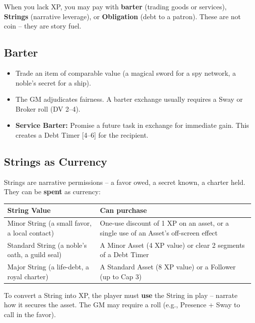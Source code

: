 When you lack XP, you may pay with \textbf{barter} (trading goods or services), \textbf{Strings} (narrative leverage), or \textbf{Obligation} (debt to a patron). These are not coin -- they are story fuel.

\subsection{Barter}
\label{subsec:barter}

\begin{itemize}
  \item Trade an item of comparable value (a magical sword for a spy network, a noble's secret for a ship).
  \item The GM adjudicates fairness. A barter exchange usually requires a Sway or Broker roll (DV 2--4).
  \item \textbf{Service Barter:} Promise a future task in exchange for immediate gain. This creates a Debt Timer [4--6] for the recipient.
\end{itemize}

\subsection{Strings as Currency}
\label{subsec:strings-currency}

Strings are narrative permissions -- a favor owed, a secret known, a charter held. They can be \textbf{spent} as currency:

\begin{center}
\begin{tabular}{ll}
\toprule
\textbf{String Value} & \textbf{Can purchase} \\
\midrule
Minor String (a small favor, a local contact) & One-use discount of 1 XP on an asset, or a single use of an Asset's off-screen effect \\
Standard String (a noble's oath, a guild seal) & A Minor Asset (4 XP value) or clear 2 segments of a Debt Timer \\
Major String (a life-debt, a royal charter) & A Standard Asset (8 XP value) or a Follower (up to Cap 3) \\
\bottomrule
\end{tabular}
\end{center}

To convert a String into XP, the player must \textbf{use} the String in play -- narrate how it secures the asset. The GM may require a roll (e.g., Presence + Sway to call in the favor).

